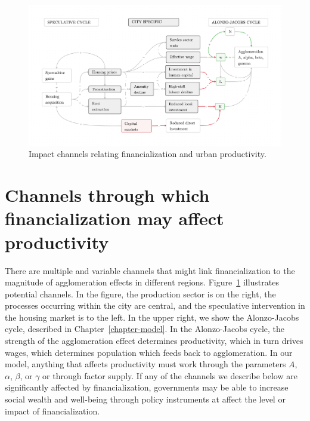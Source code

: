 \begin{figure}[h!tb]
\begin{adjustwidth}{-0.24\textwidth}{-0.24\textwidth}
\centering
\includegraphics[scale=.15 ]{fig/impact-channels.png}%
\end{adjustwidth}
\caption{Impact channels relating financialization and urban productivity.} \label{fig-impact-channels}
\end{figure}


\section{Channels through which financialization may affect productivity}

There are multiple and variable channels that %
might link financialization to the magnitude of agglomeration effects in different regions. Figure~\ref{fig-impact-channels} illustrates potential channels. %
In the figure, the production sector is on the right, the processes occurring within the city are central, and the speculative intervention in the housing market is to the left. In the upper right, we show the \gls{Alonzo-Jacobs cycle}, described in Chapter~\ref{chapter-model}. In the Alonzo-Jacobs cycle, the strength of the agglomeration effect determines productivity, which in turn drives wages, which determines population which feeds back to agglomeration. In our model, anything that affects productivity must work through the parameters $A$, $\alpha$, $\beta$, or $\gamma$ or through factor supply. If any of the channels we describe below are significantly affected by financialization, governments may be able to increase social wealth and well-being through policy instruments at affect the level or impact of financialization. 

